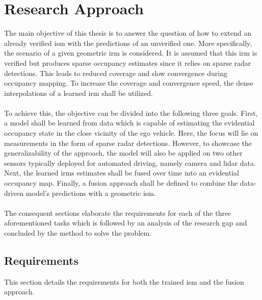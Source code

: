 \chapter{Research Approach}
\label{ch:research_approach}
The main objective of this thesis is to answer the question of how to extend an already verified \gls{ism} with the predictions of an unverified one. More specifically, the scenario of a given geometric \gls{irm} is considered. It is assumed that this \gls{irm} is verified but produces sparse occupancy estimates since it relies on sparse radar detections. This leads to reduced coverage and slow convergence during occupancy mapping. To increase the coverage and convergence speed, the dense interpolations of a learned \gls{irm} shall be utilized.
\\\\
To achieve this, the objective can be divided into the following three goals. First, a model shall be learned from data which is capable of estimating the evidential occupancy state in the close vicinity of the ego vehicle. Here, the focus will lie on measurements in the form of sparse radar detections. However, to showcase the generalizability of the approach, the model will also be applied on two other sensors typically deployed for automated driving, namely camera and lidar data. Next, the learned \gls{irm}s estimates shall be fused over time into an evidential occupancy map. Finally, a fusion approach shall be defined to combine the data-driven model's predictions with a geometric \gls{ism}.
\\\\
The consequent sections elaborate the requirements for each of the three aforementioned tasks which is followed by an analysis of the research gap and concluded by the method to solve the problem. 
%
\section{Requirements}
\label{sec:requirements}
This section details the requirements for both the trained \gls{ism} and the fusion approach.
%
